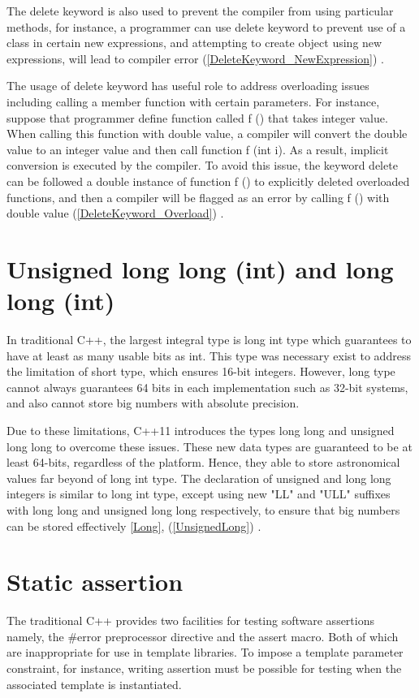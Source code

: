 \documentclass[11pt]{report}
\begin{document}
The delete keyword is also used to prevent the compiler from using particular methods, for instance, a programmer can use delete keyword to prevent use of a class in certain new expressions, and attempting to create object using new expressions, will lead to compiler error (\ref{DeleteKeyword_NewExpression}) \cite{ISO:2011:Cpplanguage}.


The usage of delete keyword has useful role to address overloading issues including calling a member function with certain parameters.  For instance, suppose that programmer define function called f () that takes integer value. When calling this function with double value, a compiler will convert the double value to an integer value and then call function f (int i). As a result, implicit conversion is executed by the compiler. To avoid this issue, the keyword delete can be followed a double instance of function f () to explicitly deleted overloaded functions, and then a compiler will be flagged as an error by calling f () with double value (\ref{DeleteKeyword_Overload}) \cite{Gregorie:professionalcpp}.

\section{Unsigned long long (int) and long long (int)}
\label{section: Unsigned and long long (int)}
In traditional C++, the largest integral type is long int type which guarantees to have at least as many usable bits as int.  This type was necessary exist to address the limitation of short type, which ensures 16-bit integers. However, long type cannot always guarantees 64 bits in each implementation such as 32-bit systems, and also cannot store big numbers with absolute precision.


 Due to these limitations, C++11 introduces the types long long and unsigned long long to overcome these issues. These new data types are guaranteed to be at least 64-bits, regardless of the platform. Hence, they able to store astronomical values far beyond of long int type. The declaration of unsigned and long long integers is similar to long int type, except using new "LL" and "ULL" suffixes with long long and unsigned long long respectively, to ensure that big numbers can be stored effectively \ref{Long}, (\ref{UnsignedLong}) \cite{Overland:2011:CWF}.

\section{Static assertion}
\label{section: Static assertion}
The traditional C++ provides two facilities for testing software assertions namely, the \#error preprocessor directive and the assert macro. Both of which are inappropriate for use in template libraries.  To impose a template parameter constraint, for instance, writing assertion must be possible for testing when the associated template is instantiated.
\end{document}
